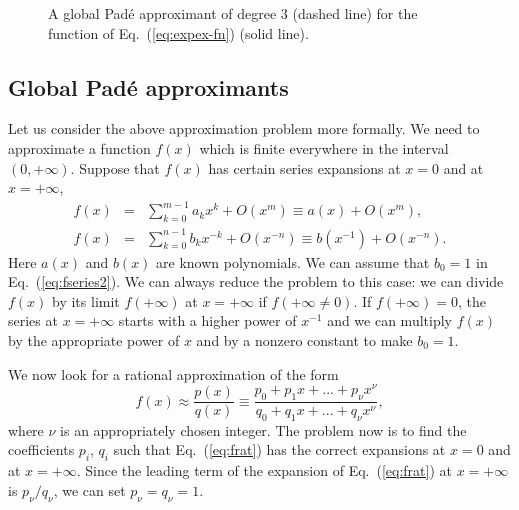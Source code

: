 \documentclass{llncs}
\begin{document}
%
\begin{figure}[htbp]


\caption{A global Pad\'e approximant of degree 3 (dashed line) for the function
of Eq.~(\ref{eq:expex-fn}) (solid line).\label{fig:expex}}
\end{figure}



\subsection{Global Pad\'e approximants}

\label{sec:globalPade} Let us consider the above approximation problem
more formally. We need to approximate a function $f\left(x\right)$
which is finite everywhere in the interval $\left(0,+\infty \right)$.
Suppose that $f\left(x\right)$ has certain series expansions at $x=0$
and at $x=+\infty $,\begin{eqnarray}
f\left(x\right) & = & \sum _{k=0}^{m-1}a_{k}x^{k}+O\left(x^{m}\right)\equiv a\left(x\right)+O\left(x^{m}\right),\label{eq:fseries1}\\
f\left(x\right) & = & \sum _{k=0}^{n-1}b_{k}x^{-k}+O\left(x^{-n}\right)\equiv b\left(x^{-1}\right)+O\left(x^{-n}\right).\label{eq:fseries2}
\end{eqnarray}
Here $a\left(x\right)$ and $b\left(x\right)$ are known polynomials.
We can assume that $b_{0}=1$ in Eq.~(\ref{eq:fseries2}). We can
always reduce the problem to this case: we can divide $f\left(x\right)$
by its limit $f\left(+\infty \right)$ at $x=+\infty $ if $f\left(+\infty \neq 0\right)$.
If $f\left(+\infty \right)=0$, the series at $x=+\infty $ starts
with a higher power of $x^{-1}$ and we can multiply $f\left(x\right)$
by the appropriate power of $x$ and by a nonzero constant to make
$b_{0}=1$.

We now look for a rational approximation of the form\begin{equation}
f\left(x\right)\approx \frac{p\left(x\right)}{q\left(x\right)}\equiv \frac{p_{0}+p_{1}x+...+p_{\nu }x^{\nu }}{q_{0}+q_{1}x+...+q_{\nu }x^{\nu }},\label{eq:frat}\end{equation}
where $\nu $ is an appropriately chosen integer. The problem now
is to find the coefficients $p_{i}$, $q_{i}$ such that Eq.~(\ref{eq:frat})
has the correct expansions at $x=0$ and at $x=+\infty $. Since the
leading term of the expansion of Eq.~(\ref{eq:frat}) at $x=+\infty $
is $p_{\nu }/q_{\nu }$, we can set $p_{\nu }=q_{\nu }=1$.
\end{document}

